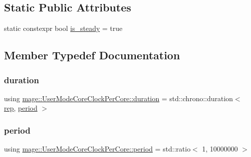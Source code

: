 \subsection*{Static Public Attributes}
\begin{DoxyCompactItemize}
\item 
static constexpr bool \mbox{\hyperlink{structmage_1_1_user_mode_core_clock_per_core_ae41f27cabafd1e7d5b703d3ebf32a97d}{is\+\_\+steady}} = true
\end{DoxyCompactItemize}


\subsection{Member Typedef Documentation}
\mbox{\label{structmage_1_1_user_mode_core_clock_per_core_a55aa3108b2d755c6b8df89ba37585fbb}} 
\subsubsection{\texorpdfstring{duration}{duration}}
{\footnotesize\ttfamily using \mbox{\hyperlink{structmage_1_1_user_mode_core_clock_per_core_a55aa3108b2d755c6b8df89ba37585fbb}{mage\+::\+User\+Mode\+Core\+Clock\+Per\+Core\+::duration}} =  std\+::chrono\+::duration$<$ \mbox{\hyperlink{structmage_1_1_user_mode_core_clock_per_core_a287b38a7811aa8bb1a1829ac316acd09}{rep}}, \mbox{\hyperlink{structmage_1_1_user_mode_core_clock_per_core_ad34694d282d2fdbdf1f09b4a49ae7416}{period}} $>$}

\mbox{\label{structmage_1_1_user_mode_core_clock_per_core_ad34694d282d2fdbdf1f09b4a49ae7416}} 
\subsubsection{\texorpdfstring{period}{period}}
{\footnotesize\ttfamily using \mbox{\hyperlink{structmage_1_1_user_mode_core_clock_per_core_ad34694d282d2fdbdf1f09b4a49ae7416}{mage\+::\+User\+Mode\+Core\+Clock\+Per\+Core\+::period}} =  std\+::ratio$<$ 1, 10\textquotesingle{}000\textquotesingle{}000 $>$}

